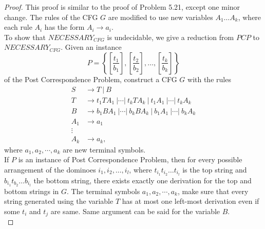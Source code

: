 \documentclass[11pt]{article}
\begin{document}
\begin{proof}
This proof is similar to the proof of Problem 5.21, except one minor change. The rules of the CFG $G$ are modified to use new variables $A_1 \dots A_k$, where each rule $A_i$ has the form $A_i \rightarrow a_i$. \\

To show that $NECESSARY_{CFG}$ is undecidable, we give a reduction from $PCP$ to $NECESSARY_{CFG}$. Given an instance
\[
P=\left\{\left[\frac{t_{1}}{b_{1}}\right] ,\left[\frac{t_{2}}{b_{2}}\right] ,\dotsc ,\left[\frac{t_{k}}{b_{k}}\right]\right\}
\]
of the Post Correspondence Problem, construct a CFG $G$ with the rules
\begin{align*}
S &\rightarrow T \ | \ B \\
T &\rightarrow t_1TA_1 \ | \cdots |  \ t_kTA_k \ | \ t_1A_1 \ | \cdots | \ t_kA_k \\
B &\rightarrow b_1BA_1 \ | \cdots |  \ b_kBA_k \ | \ b_1A_1 \ | \cdots | \ b_kA_k \\
A_1 &\rightarrow a_1 \\
\vdots & \\
A_k &\rightarrow a_k,
\end{align*}
where $a_1,a_2,\cdots,a_k$ are new terminal symbols. \\

If $P$ is an instance of Post Correspondence Problem, then for every possible arrangement of the dominoes $i_1, i_2,\dots,i_l$, where $t_{i_{1}}t_{i_{2}} \dots t_{i_{l}}$ is the top string and $b_{i_{1}}t_{b_{2}} \dots b_{i_{l}}$ the bottom string, there exists exactly one derivation for the top and bottom strings in $G$. The terminal symbols $a_1,a_2,\cdots,a_k$, make sure that every string generated using the variable $T$ has at most one left-most derivation even if some $t_{i}$ and $t_{j}$ are same. Same argument can be said for the variable $B$. \\


\end{proof}
\end{document}

